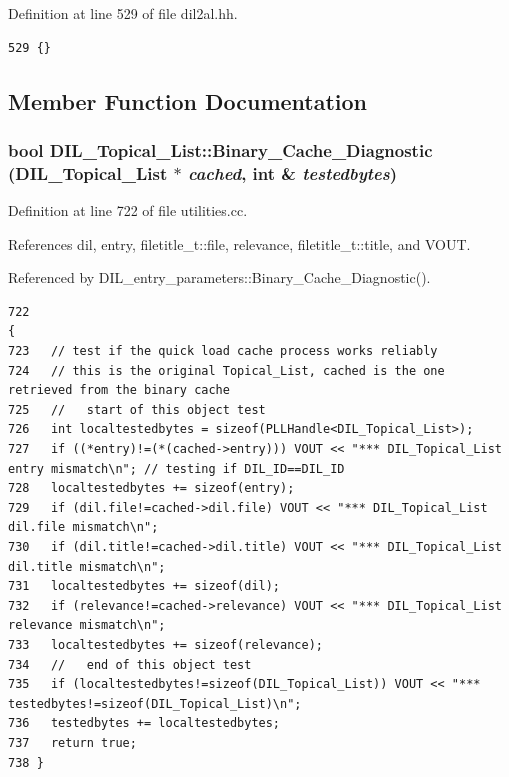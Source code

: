 Definition at line 529 of file dil2al.hh.



\footnotesize\begin{verbatim}529 {} 
\end{verbatim}\normalsize 


\subsection{Member Function Documentation}
\subsubsection{\setlength{\rightskip}{0pt plus 5cm}bool DIL\_\-Topical\_\-List::Binary\_\-Cache\_\-Diagnostic (DIL\_\-Topical\_\-List $\ast$ {\em cached}, int \& {\em testedbytes})}\label{classDIL__Topical__List_a5}




Definition at line 722 of file utilities.cc.

References dil, entry, filetitle\_\-t::file, relevance, filetitle\_\-t::title, and VOUT.

Referenced by DIL\_\-entry\_\-parameters::Binary\_\-Cache\_\-Diagnostic().



\footnotesize\begin{verbatim}722                                                                                            {
723   // test if the quick load cache process works reliably
724   // this is the original Topical_List, cached is the one retrieved from the binary cache
725   //   start of this object test
726   int localtestedbytes = sizeof(PLLHandle<DIL_Topical_List>);
727   if ((*entry)!=(*(cached->entry))) VOUT << "*** DIL_Topical_List entry mismatch\n"; // testing if DIL_ID==DIL_ID
728   localtestedbytes += sizeof(entry);
729   if (dil.file!=cached->dil.file) VOUT << "*** DIL_Topical_List dil.file mismatch\n";
730   if (dil.title!=cached->dil.title) VOUT << "*** DIL_Topical_List dil.title mismatch\n";
731   localtestedbytes += sizeof(dil);
732   if (relevance!=cached->relevance) VOUT << "*** DIL_Topical_List relevance mismatch\n";
733   localtestedbytes += sizeof(relevance);
734   //   end of this object test
735   if (localtestedbytes!=sizeof(DIL_Topical_List)) VOUT << "*** testedbytes!=sizeof(DIL_Topical_List)\n";
736   testedbytes += localtestedbytes;
737   return true;
738 }
\end{verbatim}\normalsize 
{}
